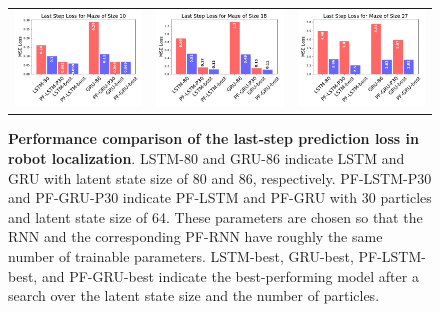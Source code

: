 \documentclass[letterpaper]{article} %
\begin{document}
\begin{figure}[t]
	\centering
	\begin{tabular}{c c c}
		\includegraphics[width=0.28\linewidth]{figs/maze_10.pdf} &
		\includegraphics[width=0.28\linewidth]{figs/maze_18.pdf} &
		\includegraphics[width=0.28\linewidth]{figs/maze_27.pdf}
	\end{tabular}
	\caption{\textbf{Performance comparison of the last-step prediction loss in robot localization}. 
		LSTM-80 and GRU-86 indicate LSTM and GRU  with latent state size of 80 and 86, respectively. 
		PF-LSTM-P30 and  PF-GRU-P30 indicate  PF-LSTM and PF-GRU with 30 particles and latent state size of 64. These parameters are chosen so that the RNN and the corresponding PF-RNN  have roughly the same number of trainable parameters.
		LSTM-best, GRU-best, PF-LSTM-best, and PF-GRU-best indicate the best-performing model after a search over the latent state size and the number of particles.
	}
	\label{fig:loc}
\end{figure}
\end{document}
